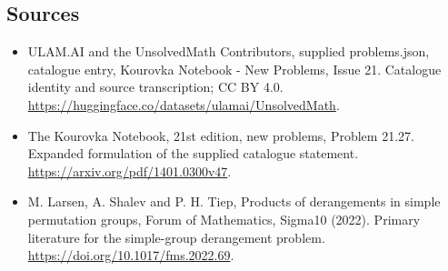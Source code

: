 \documentclass[11pt,a4paper]{article}
\begin{document}
\subsection{Sources}
\begin{itemize}
\item[S1] ULAM.AI and the UnsolvedMath Contributors, supplied problems.json, catalogue entry, Kourovka Notebook - New Problems, Issue 21. Catalogue identity and source transcription; CC BY 4.0.
\url{https://huggingface.co/datasets/ulamai/UnsolvedMath}.
\item[S2] The Kourovka Notebook, 21st edition, new problems, Problem 21.27. Expanded formulation of the supplied catalogue statement.
\url{https://arxiv.org/pdf/1401.0300v47}.
\item[S3] M. Larsen, A. Shalev and P. H. Tiep, Products of derangements in simple permutation groups, Forum of Mathematics, Sigma10 (2022). Primary literature for the simple-group derangement problem.
\url{https://doi.org/10.1017/fms.2022.69}.
\end{itemize}
\end{document}
